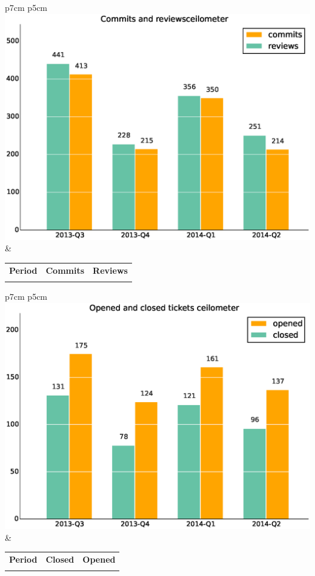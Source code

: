 \documentclass[a4wide,11pt]{report}
\begin{document}
\begin{tabular}{p{7cm} p{5cm}}
    \vspace{0pt} 
    \includegraphics[scale=.35]{figs/commitsceilometer.eps}
    & 
    \vspace{0pt}
    \begin{tabular}{l|r|r|}%
    \bfseries Period & \bfseries Commits & \bfseries Reviews %
    \csvreader[head to column names]{data/commitsceilometer.csv}{}%
    {\\ & \commits & \submitted}
    \end{tabular}
\end{tabular}

\begin{tabular}{p{7cm} p{5cm}}
    \vspace{0pt} 
    \includegraphics[scale=.35]{figs/closedceilometer.eps}
    & 
    \vspace{0pt}
    \begin{tabular}{l|r|r|}%
    \bfseries Period & \bfseries Closed & \bfseries Opened
    \csvreader[head to column names]{data/closedceilometer.csv}{}%
    {\\ & \closed & \opened}
    \end{tabular}
\end{tabular}
\end{document}
